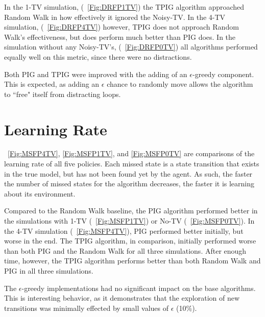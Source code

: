 \documentclass[12pt]{thesis}
\begin{document}
In the 1-TV simulation, (\figurename~\ref{Fig:DRFP1TV}) the TPIG algorithm approached Random Walk in how effectively it ignored the Noisy-TV. In the 4-TV simulation, (\figurename~\ref{Fig:DRFP4TV}) however, TPIG does not approach Random Walk's effectiveness, but does perform much better than PIG does. In the simulation without any Noisy-TV's, (\figurename~\ref{Fig:DRFP0TV}) all algorithms performed equally well on this metric, since there were no distractions.


Both PIG and TPIG were improved with the adding of an $\epsilon$-greedy component. This is expected, as adding an $\epsilon$ chance to randomly move allows the algorithm to ``free" itself from distracting loops.



\section{Learning Rate}
\figurename~\ref{Fig:MSFP4TV}, \ref{Fig:MSFP1TV}, and \ref{Fig:MSFP0TV} are comparisons of the learning rate of all five policies. Each missed state is a state transition that exists in the true model, but has not been found yet by the agent. As such, the faster the number of missed states for the algorithm decreases, the faster it is learning about its environment.

Compared to the Random Walk baseline, the PIG algorithm performed better in the simulations with 1-TV (\figurename~\ref{Fig:MSFP1TV}) or No-TV (\figurename~\ref{Fig:MSFP0TV}). In the 4-TV simulation (\figurename~\ref{Fig:MSFP4TV}), PIG performed better initially, but worse in the end. The TPIG algorithm, in comparison, initially performed worse than both PIG and the Random Walk for all three simulations. After enough time, however, the TPIG algorithm performs better than both Random Walk and PIG in all three simulations.

The $\epsilon$-greedy implementations had no significant impact on the base algorithms. This is interesting behavior, as it demonstrates that the exploration of new transitions was minimally effected by small values of $\epsilon$ (10\%).
\end{document}
